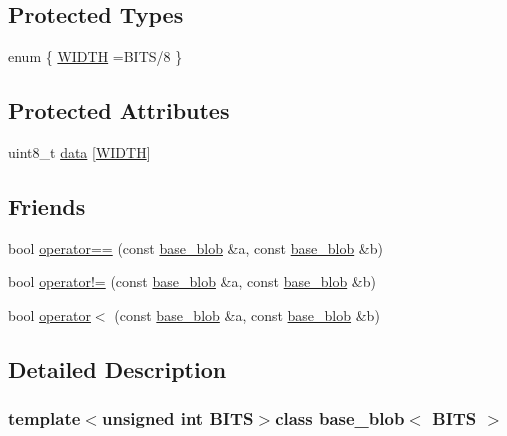 \subsection*{Protected Types}
\begin{DoxyCompactItemize}
\item 
enum \{ \hyperlink{classbase__blob_a41aa51643c1ccfdcc1fa2aad41f0fde9a3e53605ecb8eb4c497cb23476695f0c3}{W\+I\+D\+T\+H} =B\+I\+T\+S/8
 \}
\end{DoxyCompactItemize}
\subsection*{Protected Attributes}
\begin{DoxyCompactItemize}
\item 
uint8\+\_\+t \hyperlink{classbase__blob_a667a178269121efb4ec95bd59e6a9615}{data} \mbox{[}\hyperlink{classbase__blob_a41aa51643c1ccfdcc1fa2aad41f0fde9a3e53605ecb8eb4c497cb23476695f0c3}{W\+I\+D\+T\+H}\mbox{]}
\end{DoxyCompactItemize}
\subsection*{Friends}
\begin{DoxyCompactItemize}
\item 
bool \hyperlink{classbase__blob_abed369be2b14c869397bb2cccc066a13}{operator==} (const \hyperlink{classbase__blob}{base\+\_\+blob} \&a, const \hyperlink{classbase__blob}{base\+\_\+blob} \&b)
\item 
bool \hyperlink{classbase__blob_a7f04c806d3164a5c0417bcce70be4959}{operator!=} (const \hyperlink{classbase__blob}{base\+\_\+blob} \&a, const \hyperlink{classbase__blob}{base\+\_\+blob} \&b)
\item 
bool \hyperlink{classbase__blob_af1ef6aa747985902964e7a5d2f8dad05}{operator$<$} (const \hyperlink{classbase__blob}{base\+\_\+blob} \&a, const \hyperlink{classbase__blob}{base\+\_\+blob} \&b)
\end{DoxyCompactItemize}


\subsection{Detailed Description}
\subsubsection*{template$<$unsigned int B\+I\+T\+S$>$class base\+\_\+blob$<$ B\+I\+T\+S $>$}

